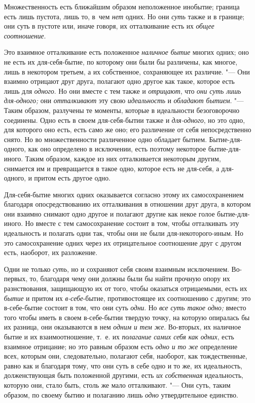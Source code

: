 Множественность есть ближайшим образом неположенное инобытие; граница есть лишь
пустота, лишь то, в~чем {\em нет} одних. Но они {\em суть} также и в границе;
они суть в пустоте или, иначе говоря, их отталкивание есть их
{\em общее соотношение}.

Это взаимное отталкивание есть положенное {\em наличное бытие} многих одних;
оно не есть их для-себя-бытие, по которому они были бы различены, как многое,
лишь в некотором третьем, а их собственное, сохраняющее их различие. "--- Они
взаимно отрицают друг друга, полагают одно другое как такое, которое есть лишь
для {\em одного}. Но они вместе с тем также и {\em отрицают}, что
{\em они суть лишь для-одного;} они {\em отталкивают} эту свою
{\em идеальность} и {\em обладают бытием}. "--- Таким образом, разлучены те
моменты, которые в идеальности безоговорочно соединены. Одно есть в своем
для-себя-бытии также и {\em для-одного}, но это одно, для которого оно есть,
есть само же оно; его различение от себя непосредственно снято. Но во
множественности различенное одно обладает бытием. Бытие-для-одного, как оно
определено в исключении, есть поэтому некоторое бытие-для-иного. Таким образом,
каждое из них отталкивается некоторым другим, снимается им и превращается в
такое одно, которое есть не для-себя, а для-одного, и притом есть другое одно.

Для-себя-бытие многих одних оказывается согласно этому их самосохранением
благодаря опосредствованию их отталкивания в отношении друг друга, в котором
они взаимно снимают одно другое и полагают другие как некое голое
бытие-для-иного. Но вместе с тем самосохранение состоит в том, чтобы
отталкивать эту идеальность и полагать одни так, чтобы они не были
для-некоторого-иным. Но это самосохранение одних через их отрицательное
соотношение друг с другом есть, наоборот, их разложение.

Одни не только {\em суть}, но и сохраняют себя своим взаимным исключением.
Во-первых, то, благодаря чему они должны были бы найти прочную опору их
разнствования, защищающую их от того, чтобы оказаться отрицаемыми, есть их
{\em бытие} и притом их {\em в-себе}-бытие, противостоящее их соотношению с
другим; это в-себе-бытие состоит в том, что они суть {\em одни}. Но
{\em все суть такое одно;} вместо того чтобы иметь в своем в-себе-бытии твердую
точку, на которую опиралась бы их разница, они оказываются в нем
{\em одним и тем же}. Во-вторых, их наличное бытие и их взаимоотношение, т.~е.
их {\em полагание самих себя как одних}, есть взаимное отрицание; но это равным
образом есть {\em одно и то же} определение всех, которым они, следовательно,
полагают себя, наоборот, как тождественные, равно как и благодаря тому, что они
суть в себе одно и то же, их идеальность, долженствующая быть положенной
другими, есть {\em их собственная} идеальность, которую они, стало быть, столь
же мало отталкивают. "--- Они суть, таким образом, по своему бытию и полаганию
лишь {\em одно} утвердительное единство.

